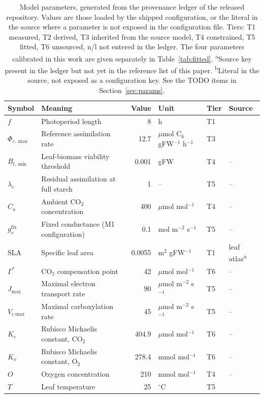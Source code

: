 \begin{table}[!htbp]
\centering
\scriptsize
\caption{Model parameters, generated from the provenance ledger of the released
repository. Values are those loaded by the shipped configuration, or the literal
in the source where a parameter is not exposed in the configuration file. Tiers:
T1 measured, T2 derived, T3 inherited from the source model, T4 constrained,
T5 fitted, T6 unsourced, n/l not entered in the ledger. The four parameters
calibrated in this work are given separately in Table~\ref{tab:fitted}.
\textsuperscript{a}Source key present in the ledger but not yet in the reference
list of this paper. \textsuperscript{b}Literal in the source, not exposed as a
configuration key. See the TODO items in Section~\ref{sec:params}.}
\label{tab:params}
\begin{tabular}{@{}llrlll@{}}
\toprule
Symbol & Meaning & Value & Unit & Tier & Source \\
\midrule
$f$ & Photoperiod length & 8 & h & T1 & \citet{Sulpice2014} \\
$\Phi_{c,\max}$ & Reference assimilation rate & 12.7 & $\mu$mol C$_6$ gFW$^{-1}$ h$^{-1}$ & T3 & \citet{Tedone2020} \\
$B_{l,\min}$ & Leaf-biomass viability threshold & 0.001 & gFW & T4 & -- \\
$\lambda_c$ & Residual assimilation at full starch & 1 & -- & T5 & -- \\
$C_a$ & Ambient CO$_2$ concentration & 400 & $\mu$mol mol$^{-1}$ & T4 & -- \\
$g_s^{\mathrm{fix}}$ & Fixed conductance (M1 configuration) & 0.1 & mol m$^{-2}$ s$^{-1}$ & T5 & -- \\
SLA & Specific leaf area & 0.0055 & m$^2$ gFW$^{-1}$ & T1 & leaf atlas\textsuperscript{a} \\
$\Gamma^{*}$ & CO$_2$ compensation point & 42 & $\mu$mol mol$^{-1}$ & T6 & -- \\
$J_{\max}$ & Maximal electron transport rate & 90 & $\mu$mol m$^{-2}$ s$^{-1}$ & T5 & -- \\
$V_{c\max}$ & Maximal carboxylation rate & 45 & $\mu$mol m$^{-2}$ s$^{-1}$ & T5 & -- \\
$K_c$ & Rubisco Michaelis constant, CO$_2$ & 404.9 & $\mu$mol mol$^{-1}$ & T6 & -- \\
$K_o$ & Rubisco Michaelis constant, O$_2$ & 278.4 & mmol mol$^{-1}$ & T6 & -- \\
$O$ & Oxygen concentration & 210 & mmol mol$^{-1}$ & T4 & -- \\
$T$ & Leaf temperature & 25 & $^\circ$C & T5 & \citet{Sulpice2014} \\

\end{tabular}
\end{table}
